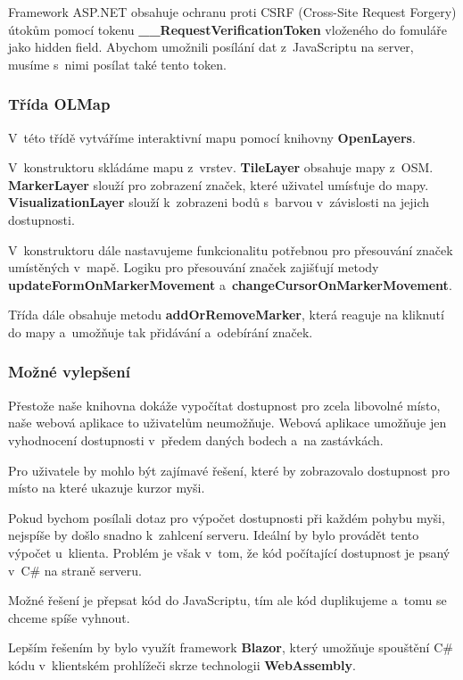 Framework ASP.NET obsahuje ochranu proti CSRF (Cross-Site Request Forgery) útokům pomocí tokenu \textbf{\_\_RequestVerificationToken} vloženého do fomuláře jako hidden field. Abychom umožnili posílání dat z~JavaScriptu na server, musíme s~nimi posílat také tento token.


\subsubsection{Třída OLMap}

V~této třídě vytváříme interaktivní mapu pomocí knihovny \textbf{OpenLayers}.

V~konstruktoru skládáme mapu z~vrstev. \textbf{TileLayer} obsahuje mapy z~OSM. \textbf{MarkerLayer} slouží pro zobrazení značek, které uživatel umísťuje do mapy. \textbf{VisualizationLayer} slouží k~zobrazeni bodů s~barvou v~závislosti na jejich dostupnosti.

V~konstruktoru dále nastavujeme funkcionalitu potřebnou pro přesouvání značek umístěných v~mapě. Logiku pro přesouvání značek zajišťují metody \textbf{updateFormOnMarkerMovement} a~\textbf{changeCursorOnMarkerMovement}.  

Třída dále obsahuje metodu \textbf{addOrRemoveMarker}, která reaguje na kliknutí do mapy a~umožňuje tak přidávání a~odebírání značek.

\subsubsection{Možné vylepšení}

Přestože naše knihovna dokáže vypočítat dostupnost pro zcela libovolné místo, naše webová aplikace to uživatelům neumožňuje. Webová aplikace umožňuje jen vyhodnocení dostupnosti v~předem daných bodech a~na zastávkách.

Pro uživatele by mohlo být zajímavé řešení, které by zobrazovalo dostupnost pro místo na které ukazuje kurzor myši.

Pokud bychom posílali dotaz pro výpočet dostupnosti při každém pohybu myši, nejspíše by došlo snadno k~zahlcení serveru. Ideální by bylo provádět tento výpočet u~klienta. Problém je však v~tom, že kód počítající dostupnost je psaný v~C\# na straně serveru.

Možné řešení je přepsat kód do JavaScriptu, tím ale kód duplikujeme a~tomu se chceme spíše vyhnout.

Lepším řešením by bylo využít framework \textbf{Blazor}, který umožňuje spouštění C\# kódu v~klientském prohlížeči skrze technologii \textbf{WebAssembly}.

